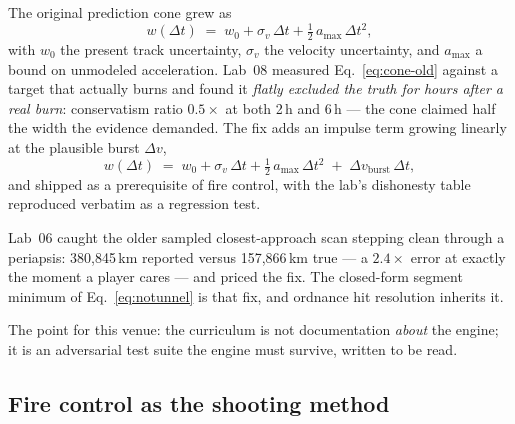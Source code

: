 \documentclass[10pt,twocolumn]{article}
\newcommand{\dt}{\Delta t}
\begin{document}
The original prediction cone grew as
\begin{equation}
w(\dt) \;=\; w_0 + \sigma_v\,\dt + \tfrac{1}{2}\,a_{\max}\,\dt^{2},
\label{eq:cone-old}
\end{equation}
\label{sec:cone}%
with $w_0$ the present track uncertainty, $\sigma_v$ the velocity uncertainty, and
$a_{\max}$ a bound on unmodeled acceleration. Lab~08 measured
Eq.~\eqref{eq:cone-old} against a target that actually burns and found it \emph{flatly
excluded the truth for hours after a real burn}: conservatism ratio $0.5\times$ at both
2\,h and 6\,h --- the cone claimed half the width the evidence demanded. The fix adds an
impulse term growing linearly at the plausible burst $\Delta v$,
\begin{equation}
w(\dt) \;=\; w_0 + \sigma_v\,\dt + \tfrac{1}{2}\,a_{\max}\,\dt^{2}
             \;+\; \Delta v_{\text{burst}}\,\dt ,
\label{eq:cone-new}
\end{equation}
and shipped as a prerequisite of fire control, with the lab's dishonesty table reproduced
verbatim as a regression test.

\label{sec:lab6}%
Lab~06 caught the older sampled closest-approach scan stepping clean through a periapsis:
380{,}845\,km reported versus 157{,}866\,km true --- a $2.4\times$ error at exactly the
moment a player cares --- and priced the fix. The closed-form segment minimum of
Eq.~\eqref{eq:notunnel} is that fix, and ordnance hit resolution inherits it.

The point for this venue: the curriculum is not documentation \emph{about} the engine; it
is an adversarial test suite the engine must survive, written to be read.

\subsection{Fire control as the shooting method}
\label{sec:shooting}
\end{document}
